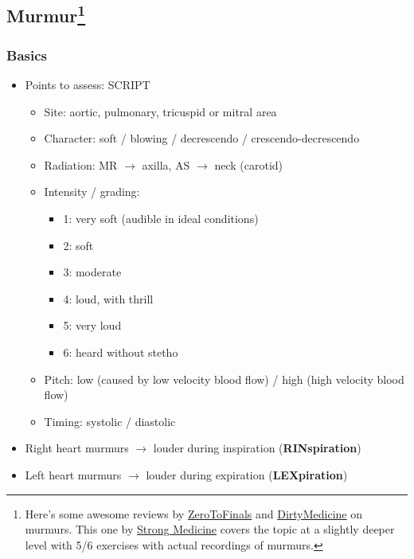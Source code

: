 \documentclass[
  12pt,
]{memoir}
\providecommand{\tightlist}{%
  \setlength{\itemsep}{0pt}\setlength{\parskip}{0pt}}
\begin{document}
\subsection[Murmur]{Murmur\footnote{Here's some awesome reviews by
 \href{https://zerotofinals.com/medicine/cardiology/murmurs/}{ZeroToFinals}
 and
 \href{https://youtu.be/teJcTTVZnzs}{DirtyMedicine} on murmurs.
 This one by \href{https://youtu.be/lFcf5a6BZGw}{Strong Medicine}
 covers the topic at a slightly deeper level with 5/6 exercises
 with actual recordings of murmurs.}}

\hypertarget{basics}{%
\subsubsection{Basics}\label{basics}}

\begin{itemize}
\tightlist
\item
  Points to assess: SCRIPT

  \begin{itemize}
  \tightlist
  \item
    Site: aortic, pulmonary, tricuspid or mitral area
  \item
    Character: soft / blowing / decrescendo / crescendo-decrescendo
  \item
    Radiation: MR \(\rightarrow\) axilla, AS \(\rightarrow\) neck
    (carotid)
  \item
    Intensity / grading:

    \begin{itemize}
    \tightlist
    \item
      1: very soft (audible in ideal conditions)
    \item
      2: soft
    \item
      3: moderate
    \item
      4: loud, with thrill
    \item
      5: very loud
    \item
      6: heard without stetho
    \end{itemize}
  \item
    Pitch: low (caused by low velocity blood flow) / high (high velocity
    blood flow)
  \item
    Timing: systolic / diastolic
  \end{itemize}
\item
  Right heart murmurs \(\rightarrow\) louder during inspiration
  (\textbf{RINspiration})
\item
  Left heart murmurs \(\rightarrow\) louder during expiration
  (\textbf{LEXpiration})
\end{itemize}
\end{document}
